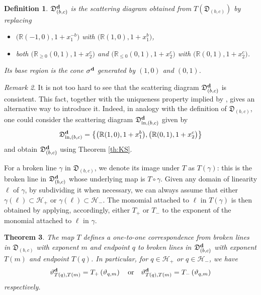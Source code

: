 \documentclass[11pt]{amsart}
\newtheorem{theorem}{Theorem}[section]
\newtheorem{defn}[theorem]{Definition}
\theoremstyle{remark}
\newtheorem{remark}[theorem]{Remark}
\numberwithin{equation}{section}
\newcommand{\RR}{\mathbb{R}}
\newcommand{\fD}{\mathfrak{D}}
\newcommand{\bfd}{{\bf d}}
\begin{document}
\begin{defn}
  $\fD_{(b,c)}^\bfd$ is the scattering diagram obtained from
  $T\left(\fD_{(b,c)}\right)$ by replacing 
  \begin{itemize}
    \item
      $\big(\RR (-1,0), 1+x_1^{-b}\big)$ with $\big(\RR  (1,0), 1+x_1^b\big)$,
    \item 
      both $ \big( \RR_{\ge0} (0,1), 1+x_2^c\big)$ and $\big( \RR_{\le0} (0,1),
      1+x_2^c\big)$ with $ \big( \RR (0,1), 1+x_2^c\big)$.
  \end{itemize}
  Its base region is the cone $\sigma^\bfd$ generated by $(1,0)$ and $(0,1)$. 
\end{defn}

\begin{remark}
  It is not too hard to see that the scattering diagram $\fD_{(b,c)}^\bfd$ is
  consistent. This fact, together with the uniqueness property implied by
  \cite[Theorem 1.7]{GHKK}, gives an alternative way to introduce it. Indeed, in
  analogy with the definition of $\fD_{(b,c)}$, one could consider the
  scattering diagram
  $\fD_{\mathrm{in},(b,c)}^\bfd$ given by 
  \[
    \fD_{\mathrm{in},(b,c)}^\bfd=
    \left\{
      \big(\RR (1,0), 1+x_1^b\big), 
      \big(\RR (0,1), 1+x_2^c\big)
    \right\}
  \]
  and obtain $\fD_{(b,c)}^\bfd$ using Theorem \ref{th:KS}. 
\end{remark}

For a broken line $\gamma$ in $\fD_{(b,c)}$, we denote its image under $T$ as
$T(\gamma)$: this is the broken line in $\fD_{(b,c)}^\bfd$ whose underlying map
is $T\circ\gamma$. Given any domain of linearity $\ell$ of $\gamma$, by
subdividing it when necessary, we can always assume that either $\gamma(\ell)
\subset \mathcal{H}_{+} $ or $\gamma(\ell)\subset \mathcal{H}_{-}$. The monomial
attached to $\ell$ in $T(\gamma)$ is then obtained by applying, accordingly, either
$T_+$ or $T_-$ to the exponent of the monomial attached to $\ell$ in $\gamma$.

\begin{theorem}
  \label{thm:T_on_broken_lines}
  The map $T$ defines a one-to-one correspondence from broken lines in $\fD_{(b,c)}$
  with exponent $m$ and endpoint $q$ to broken lines in $\fD_{(b,c)}^\bfd$ with exponent $T(m)$
  and endpoint $T(q)$. In particular, for $q\in\mathcal{H}_+$ or $q\in\mathcal{H}_-$,
  we have
  \[ 
    \vartheta^\bfd_{T(q),T(m)}=T_{+} \left(\vartheta_{q,m}\right) 
    \quad
    \mbox{or} 
    \quad
    \vartheta^\bfd_{T(q),T(m)}=T_{-}\left(\vartheta_{q,m}\right)
  \]
  respectively.
\end{theorem}
\end{document}
